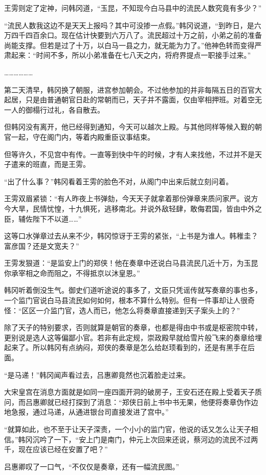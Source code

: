 王雱则定了定神，问韩冈道，“玉昆，不知现今白马县中的流民人数究竟有多少？”

“流民人数我这边不是天天上报吗？其中可没掺一点假。”韩冈说道，“到昨日，是六万四千四百余口。现在估计快要到六万八了。流民超过十万之前，小弟之前的准备尚能支撑。但若是过了十万，以白马一县之力，就无能为力了。”他神色转而变得严肃起来：“时间不多，所以小弟准备在七八天之内，将府界提点一职接手过来。”

………………

第二天清早，韩冈换了朝服，进宫参加朝会。不过他参加的并非每隔五日的百官大起居，只是由普通朝官日赴的常朝而已，天子并不露面，仅由宰相押班。对着空无一人的御榻行过礼，各自散去。

但韩冈没有离开，他已经得到通知，今天可以越次上殿。与其他同样等候入觐的朝官一起，守在阁门内，等着内殿重臣议事结束。

但等许久，不见宫中有传。一直等到快中午的时候，才有人来找他，不过并不是天子遣来的班直，而是王雱。

“出了什么事？”韩冈看着王雱的脸色不对，从阁门中出来后就立刻问着。

王雱双眉紧锁：“有人昨夜上书弹劾，今天天子就拿着那份弹章来质问家严。说方今大旱，民情忧惶，十九惧死，逃移南北。并说外敌轻肆，敢侮君国，皆由中外之臣，辅佐陛下不以道……”

这等口水弹章过去从来不少，韩冈惊讶于王雱的紧张，“上书是为谁人。韩稚圭？富彦国？还是文宽夫？”

王雱发狠道：“是监安上门的郑侠！他在奏章中还说白马县流民几近十万，为玉昆你承宰相之命而阻之，不得抵京以沐皇恩。”

韩冈听着倒没生气。御史们道听途说的事多了，文臣只凭谣传就写奏章的事也多，一个监门官说白马县流民如何如何，根本不算什么特别。但有一件事却让人很奇怪：“区区一介监门官，选人而已，他怎么将奏章直接递到天子案头上的？”

除了天子的特别要求，否则就算是朝官的奏章，也都是得由中书或是枢密院中转，更别说是选人这等偏鄙小官。若非有此定规，崇政殿早就给雪片般飞来的奏章给埋起来了。所以韩冈有点纳闷，郑侠的奏章是怎么给赵顼看到的，还是有黑手在后面。

“是马递！”韩冈闻声看过去，吕惠卿竟然也沉着脸走过来。

大宋皇宫在消息方面就是如同一座四面开洞的破房子，王安石还在殿上受着天子质问，而吕惠卿就已经打探到了消息：“郑侠日前上书中书无果，他便将奏章伪作边地急报，通过马递，从通进银台司直接发进了宫中。”

“就算如此，也不至于让天子深责，一个小小的监门官，他说的话又怎么让天子相信。”韩冈沉吟了一下，“安上门是南门，仲元上次回来还说，蔡河边的流民不过两千，现在应该已经在安置了吧？”

吕惠卿叹了一口气，“不仅仅是奏章，还有一幅流民图。”

